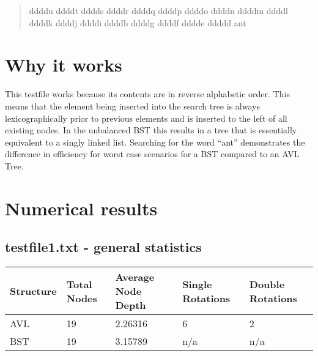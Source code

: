 \documentclass{article} %
\begin{document}
\begin{quote}
ddddu ddddt dddds ddddr ddddq ddddp ddddo ddddn ddddm ddddl ddddk ddddj ddddi ddddh ddddg ddddf dddde ddddd ant
\end{quote}

\section{Why it works}
This testfile works because its contents are in reverse alphabetic order. This means that the element being inserted into the search tree is always lexicographically prior to previous elements and is inserted to the left of all existing nodes. In the unbalanced BST this results in a tree that is essentially equivalent to a singly linked list. Searching for the word ``ant'' demonstrates the difference in efficiency for worst case scenarios for a BST compared to an AVL Tree.

\section{Numerical results}
\subsection*{testfile1.txt - general statistics}
\begin{tabular}{|l|l|l|l|l|}
\hline
Structure & Total Nodes & Average Node Depth & Single Rotations & Double Rotations \\ \hline
AVL       & 19          & 2.26316            & 6                & 2                \\ \hline
BST       & 19          & 3.15789            & n/a              & n/a              \\ \hline
\end{tabular}
\end{document}
